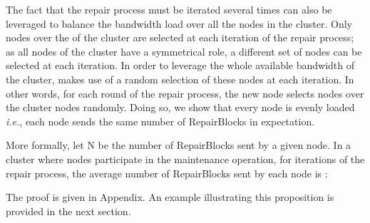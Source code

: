 The fact that the repair process must be iterated several times can also be leveraged to balance the bandwidth load over all the nodes in the cluster.
Only  nodes over the  of the cluster are selected at each iteration of the repair process; as all nodes of the cluster have a symmetrical role, a different set of  nodes can be selected at each iteration.
In order to leverage the whole available bandwidth of the cluster, \crc makes use of a random selection of these  nodes at each iteration.
In other words, for each round of the repair process, the new node selects  nodes over the  cluster nodes randomly. 
Doing so, we show that every node is evenly loaded \emph{i.e.}, each node sends the same number of RepairBlocks in expectation. 

More formally, let N be the number of RepairBlocks sent by a given node. In a cluster where  nodes participate in the maintenance operation, for  iterations of the repair process, the average number of RepairBlocks sent by each node is : 
 

The proof is given in Appendix.
An example illustrating this proposition is provided in the next section.


